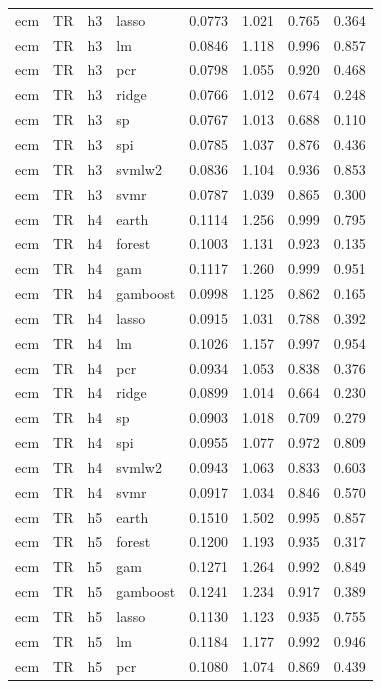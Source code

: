 \begin{ThreePartTable}
\begin{longtable}[t]{llclcccc}
ecm & TR & h3 & lasso & 0.0773 & 1.021 & 0.765 & 0.364\\
ecm & TR & h3 & lm & 0.0846 & 1.118 & 0.996 & 0.857\\
ecm & TR & h3 & pcr & 0.0798 & 1.055 & 0.920 & 0.468\\
ecm & TR & h3 & ridge & 0.0766 & 1.012 & 0.674 & 0.248\\
ecm & TR & h3 & sp & 0.0767 & 1.013 & 0.688 & 0.110\\
ecm & TR & h3 & spi & 0.0785 & 1.037 & 0.876 & 0.436\\
ecm & TR & h3 & svmlw2 & 0.0836 & 1.104 & 0.936 & 0.853\\
ecm & TR & h3 & svmr & 0.0787 & 1.039 & 0.865 & 0.300\\
\addlinespace
ecm & TR & h4 & earth & 0.1114 & 1.256 & 0.999 & 0.795\\
ecm & TR & h4 & forest & 0.1003 & 1.131 & 0.923 & 0.135\\
ecm & TR & h4 & gam & 0.1117 & 1.260 & 0.999 & 0.951\\
ecm & TR & h4 & gamboost & 0.0998 & 1.125 & 0.862 & 0.165\\
ecm & TR & h4 & lasso & 0.0915 & 1.031 & 0.788 & 0.392\\
ecm & TR & h4 & lm & 0.1026 & 1.157 & 0.997 & 0.954\\
ecm & TR & h4 & pcr & 0.0934 & 1.053 & 0.838 & 0.376\\
ecm & TR & h4 & ridge & 0.0899 & 1.014 & 0.664 & 0.230\\
ecm & TR & h4 & sp & 0.0903 & 1.018 & 0.709 & 0.279\\
ecm & TR & h4 & spi & 0.0955 & 1.077 & 0.972 & 0.809\\
ecm & TR & h4 & svmlw2 & 0.0943 & 1.063 & 0.833 & 0.603\\
ecm & TR & h4 & svmr & 0.0917 & 1.034 & 0.846 & 0.570\\
\addlinespace
ecm & TR & h5 & earth & 0.1510 & 1.502 & 0.995 & 0.857\\
ecm & TR & h5 & forest & 0.1200 & 1.193 & 0.935 & 0.317\\
ecm & TR & h5 & gam & 0.1271 & 1.264 & 0.992 & 0.849\\
ecm & TR & h5 & gamboost & 0.1241 & 1.234 & 0.917 & 0.389\\
ecm & TR & h5 & lasso & 0.1130 & 1.123 & 0.935 & 0.755\\
ecm & TR & h5 & lm & 0.1184 & 1.177 & 0.992 & 0.946\\
ecm & TR & h5 & pcr & 0.1080 & 1.074 & 0.869 & 0.439\\

\end{longtable}
\end{ThreePartTable}
